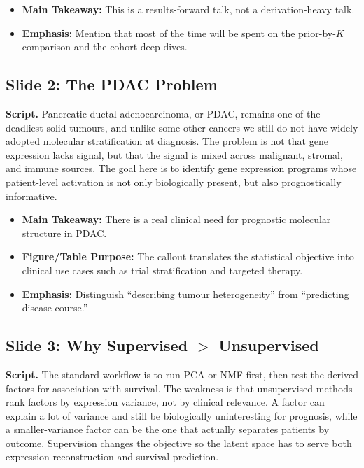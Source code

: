 \documentclass[11pt]{article}
\newcommand{\scriptlabel}{\textbf{Script. }}
\newcommand{\sectionlabel}[1]{\textbf{#1}}
\begin{document}
\begin{itemize}
\item \sectionlabel{Main Takeaway:} This is a results-forward talk, not a derivation-heavy talk.
\item \sectionlabel{Emphasis:} Mention that most of the time will be spent on the prior-by-$K$ comparison and the cohort deep dives.
\end{itemize}

\subsection*{Slide 2: The PDAC Problem}
\scriptlabel Pancreatic ductal adenocarcinoma, or PDAC, remains one of the deadliest solid tumours, and unlike some other cancers we still do not have widely adopted molecular stratification at diagnosis. The problem is not that gene expression lacks signal, but that the signal is mixed across malignant, stromal, and immune sources. The goal here is to identify gene expression programs whose patient-level activation is not only biologically present, but also prognostically informative.

\begin{itemize}
\item \sectionlabel{Main Takeaway:} There is a real clinical need for prognostic molecular structure in PDAC.
\item \sectionlabel{Figure/Table Purpose:} The callout translates the statistical objective into clinical use cases such as trial stratification and targeted therapy.
\item \sectionlabel{Emphasis:} Distinguish ``describing tumour heterogeneity'' from ``predicting disease course.''
\end{itemize}

\subsection*{Slide 3: Why Supervised $>$ Unsupervised}
\textbf{Script.} The standard workflow is to run PCA or NMF first, then test the derived factors for association with survival. The weakness is that unsupervised methods rank factors by expression variance, not by clinical relevance. A factor can explain a lot of variance and still be biologically uninteresting for prognosis, while a smaller-variance factor can be the one that actually separates patients by outcome. Supervision changes the objective so the latent space has to serve both expression reconstruction and survival prediction.
\end{document}

